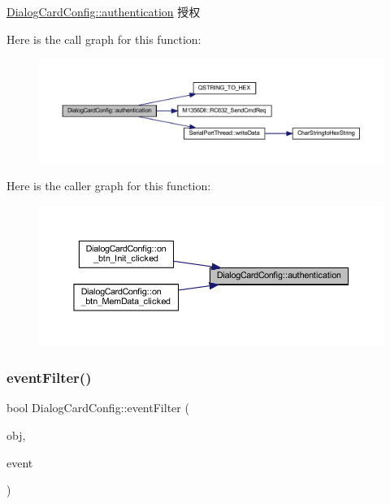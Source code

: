 \mbox{\hyperlink{class_dialog_card_config_a4d73ad9ea40ad536bdccce7cb5a985bc}{Dialog\+Card\+Config\+::authentication}} 授权 

Here is the call graph for this function\+:
\nopagebreak
\begin{figure}[H]
\begin{center}
\leavevmode
\includegraphics[width=350pt]{class_dialog_card_config_a4d73ad9ea40ad536bdccce7cb5a985bc_cgraph}
\end{center}
\end{figure}
Here is the caller graph for this function\+:
\nopagebreak
\begin{figure}[H]
\begin{center}
\leavevmode
\includegraphics[width=350pt]{class_dialog_card_config_a4d73ad9ea40ad536bdccce7cb5a985bc_icgraph}
\end{center}
\end{figure}
\mbox{\label{class_dialog_card_config_a8d0540f792fe8b7a434e010a5c22a0df}} 
\subsubsection{\texorpdfstring{eventFilter()}{eventFilter()}}
{\footnotesize\ttfamily bool Dialog\+Card\+Config\+::event\+Filter (\begin{DoxyParamCaption}\item[{Q\+Object $\ast$}]{obj,  }\item[{Q\+Event $\ast$}]{event }\end{DoxyParamCaption})\hspace{0.3cm}{\ttfamily [protected]}}



